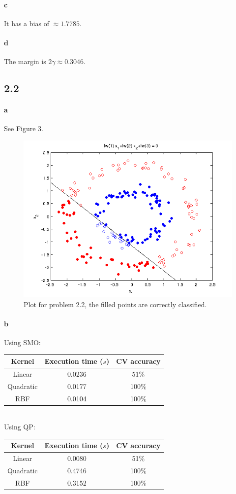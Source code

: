 \documentclass{article}
\begin{document}
\paragraph{c}
It has a bias of $\approx 1.7785$.

\paragraph{d}
The margin is $2\gamma \approx 0.3046$.

\subsection*{2.2}
\paragraph{a}
See Figure 3.
\begin{figure}
\begin{center}
\includegraphics[scale = 0.6]{pics/plot22.png}
\caption{ Plot for problem 2.2, the filled points are correctly classified.}
\end{center}
\end{figure}

\paragraph{b}

Using SMO:

\begin{tabular}{c | c | c}
  Kernel & Execution time ($s$)& CV accuracy\\
  \hline
  Linear & 0.0236 & 51\%\\
  Quadratic & 0.0177 & 100\%\\
  RBF & 0.0104 & 100\%
\end{tabular}\\

Using QP:

\begin{tabular}{c | c | c}
  Kernel & Execution time ($s$)& CV accuracy\\
  \hline
  Linear & 0.0080 & 51\%\\
  Quadratic & 0.4746 & 100\%\\
  RBF & 0.3152 & 100\%
\end{tabular}
\end{document}

